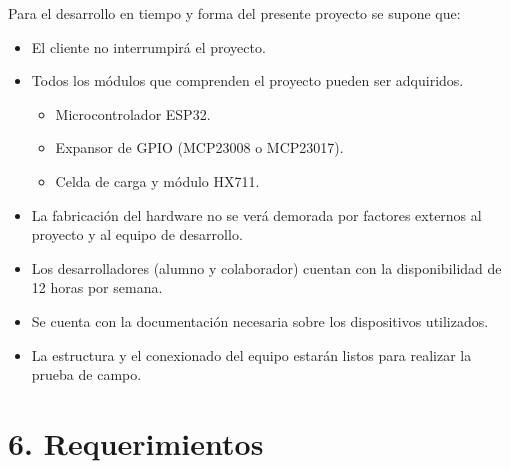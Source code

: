\documentclass[
11pt, %
]{charter}
\begin{document}
Para el desarrollo en tiempo y forma del presente proyecto se supone que:
\begin{itemize}
	\item El cliente no interrumpirá el proyecto.
	\item Todos los módulos que comprenden el proyecto pueden ser adquiridos.
	\begin{itemize}
		\item Microcontrolador ESP32.
		\item Expansor de GPIO (MCP23008 o MCP23017).
		\item Celda de carga y módulo HX711.
	\end{itemize}
	\item La fabricación del hardware no se verá demorada por factores externos al proyecto y al equipo de desarrollo.
	\item Los desarrolladores (alumno y colaborador) cuentan con la disponibilidad de 12 horas por semana.
	\item Se cuenta con la documentación necesaria sobre los dispositivos utilizados.
	\item La estructura y el conexionado del equipo estarán listos para realizar la prueba de campo.
\end{itemize}

\section{6. Requerimientos}
\label{sec:requerimientos}
\end{document}
